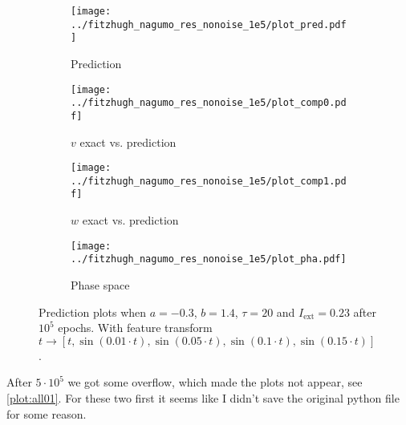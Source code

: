 \documentclass[a4paper]{article}
\begin{document}
\begin{figure}[H]
	\centering 
	\begin{subfigure}[b]{0.47\textwidth}
		\centering
		\texttt{[image: ../fitzhugh\_nagumo\_res\_nonoise\_1e5/plot\_pred.pdf]}
		\caption{Prediction}
		\label{fig:all00a}
	\end{subfigure}
	\begin{subfigure}[b]{0.47\textwidth}
		\centering
		\texttt{[image: ../fitzhugh\_nagumo\_res\_nonoise\_1e5/plot\_comp0.pdf]}
		\caption{$v$ exact vs. prediction}
		\label{fig:all00b}
	\end{subfigure}
	\begin{subfigure}[b]{0.47\textwidth}
		\centering
		\texttt{[image: ../fitzhugh\_nagumo\_res\_nonoise\_1e5/plot\_comp1.pdf]}
		\caption{$w$ exact vs. prediction}
		\label{fig:all00c}
	\end{subfigure}
	\begin{subfigure}[b]{0.47\textwidth}
		\centering
		\texttt{[image: ../fitzhugh\_nagumo\_res\_nonoise\_1e5/plot\_pha.pdf]}
		\caption{Phase space}
		\label{fig:all00d}
	\end{subfigure}
	\caption{Prediction plots when $a=-0.3$, $b=1.4$, $\tau=20$ and $ I_{\text{ext}}=0.23$ after $10^5$ epochs. With feature transform $t \rightarrow \left[ t, \sin(0.01 \cdot  t), \sin(0.05 \cdot  t), \sin(0.1 \cdot  t), \sin(0.15 \cdot  t)\right] $.}
	\label{plot:all00}
\end{figure}


After $5\cdot10^5$ we got some overflow, which made the plots not appear, see \ref{plot:all01}. For these two first it seems like	I didn't save the original python file for some reason.	
\end{document}
